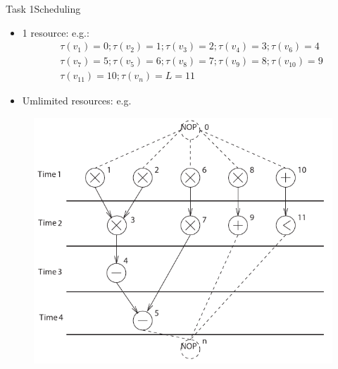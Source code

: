 \begin{frame}[allowframebreaks]{Task 1}{Scheduling}
\begin{solutionnoinc}
\begin{itemize}
\begin{itemize}
        \end{itemize}
    \end{itemize}
  \end{solutionnoinc}
  \begin{solutionnoinc}
    \begin{itemize}
        \item 1 resource: e.g.:
        \[
          \begin{gathered}
          \tau\left(v_1\right)=0 ; \tau\left(v_2\right)=1 ; \tau\left(v_3\right)=2 ; \tau\left(v_4\right)=3 ; \tau\left(v_6\right)=4 \\
          \tau\left(v_7\right)=5 ; \tau\left(v_5\right)=6 ; \tau\left(v_8\right)=7 ; \tau\left(v_9\right)=8 ; \tau\left(v_{10}\right)=9 \\
          \tau\left(v_{11}\right)=10 ; \tau\left(v_n\right)=L=11
          \end{gathered}
        \]
    \end{itemize}
  \end{solutionnoinc}
  \begin{solutionnoinc}
    \begin{itemize}
      \item Umlimited resources: e.g.
    \end{itemize}
    \begin{figure}
      \centering
      \includegraphics[height=0.5\paperheight]{./figures/task1_starting_times.png}
    \end{figure}
  \end{solutionnoinc}
\end{frame}

